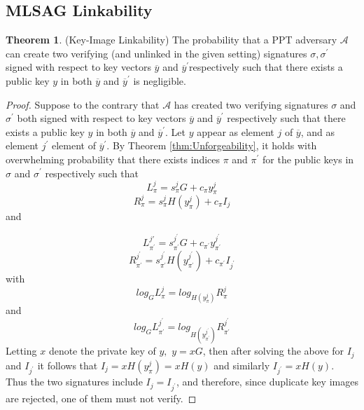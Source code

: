 \documentclass[12pt,english]{mrl}
\theoremstyle{definition}
\newtheorem{thm}[lem]{Theorem}
\numberwithin{equation}{section}
\numberwithin{figure}{section}
\numberwithin{equation}{section}
\numberwithin{equation}{section}
\numberwithin{figure}{section}
\begin{document}
\subsection{MLSAG Linkability}
\begin{thm}
(Key-Image Linkability) The probability that a PPT adversary $\mathcal{A}$
can create two verifying (and unlinked in the given setting) signatures $\sigma,\sigma^{\prime}$ signed
with respect to key vectors $\overline{y}$ and $\overline{y}^{\prime}$respectively
such that there exists a public key $y$ in both $\overline{y}$ and
$\overline{y}^{\prime}$ is negligible. \end{thm}
\begin{proof}
Suppose to the contrary that $\mathcal{A}$ has created two verifying
signatures $\sigma$ and $\sigma^{\prime}$ both signed with respect to key
vectors $\overline{y}$ and $\overline{y}^{\prime}$ respectively such
that there exists a public key $y$ in both $\overline{y}$ and $\overline{y}^{\prime}.$
Let $y$ appear as element $j$ of $\overline{y}$,  and as element
$j^{\prime}$ element of $\overline{y}^{\prime}.$ By Theorem \ref{thm:Unforgeability},
it holds with overwhelming probability that there exists indices $\pi$
and $\pi^{\prime}$ for the public keys in $\sigma$ and $\sigma^{\prime}$
respectively such that 
\[
L_{\pi}^{j}=s_{\pi}^{j}G+c_{\pi}y_{\pi}^{j}
\]
\[
R_{\pi}^{j}=s_{\pi}^{j}H\left(y_{\pi}^{j}\right)+c_{\pi}I_{j}
\]
 and 

\[
L_{\pi^{\prime}}^{j\prime}=s_{\pi^{\prime}}^{j^{\prime}}G+c_{\pi^{\prime}}y_{\pi^{\prime}}^{j^{\prime}}
\]
\[
R_{\pi^{\prime}}^{j^{\prime}}=s_{\pi^{\prime}}^{j^{\prime}}H\left(y_{\pi^{\prime}}^{j^{\prime}}\right)+c_{\pi^{\prime}}I_{j^{\prime}}
\]
 with 
\[
log_{G}L_{\pi}^{j}=log_{H\left(y_{\pi}^{j}\right)}R_{\pi}^{j}
\]
 and 
\[
log_{G}L_{\pi^{\prime}}^{j^{\prime}}=log_{H\left(y_{\pi^{\prime}}^{j^{\prime}}\right)}R_{\pi^{\prime}}^{j^{\prime}}
\]
Letting $x$ denote the private key of $y,$ $y=xG$, then after solving
the above for $I_{j}$ and $I_{j^{\prime}}$ it follows that $I_{j}=xH\left(y_{\pi}^{j}\right)=xH\left(y\right)$
and similarly $I_{j^{\prime}}=xH\left(y\right).$ Thus the two signatures
include $I_{j}=I_{j^{\prime}}$, and therefore, since duplicate key images are rejected, one of them must not verify. 
\end{proof}
\end{document}
